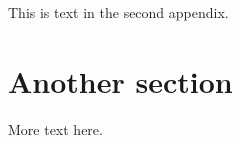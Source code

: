 
This is text in the second appendix.
\section{Another section}
\label{a2:experimental_images}

More text here.